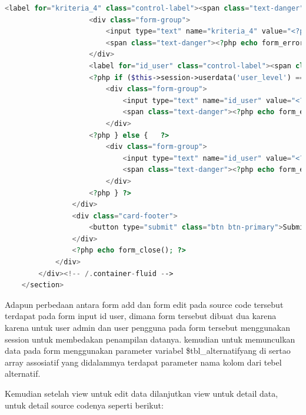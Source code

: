 \begin{lstlisting}[language=PHP]
	                <label for="kriteria_4" class="control-label"><span class="text-danger">*</span>Memori</label>  
	                <div class="form-group">  
	                    <input type="text" name="kriteria_4" value="<?php echo ($this->input->post('kriteria_4') ? $this->input->post('kriteria_4') : $tbl_alternatif['kriteria_4']); ?>" class="form-control" id="kriteria_4" />  
	                    <span class="text-danger"><?php echo form_error('kriteria_4'); ?></span>  
	                </div>  
	                <label for="id_user" class="control-label"><span class="text-danger">*</span>Id User</label>  
	                <?php if ($this->session->userdata('user_level') === 'admin') {    ?>  
	                    <div class="form-group">  
	                        <input type="text" name="id_user" value="<?php echo ($this->input->post('id_user') ? $this->input->post('id_user') : $tbl_alternatif['id_user']); ?>" class="form-control" id="id_user" /> 
	                        <span class="text-danger"><?php echo form_error('id_user'); ?></span>  
	                    </div>  
	                <?php } else {   ?>  
	                    <div class="form-group">  
	                        <input type="text" name="id_user" value="<?php echo ($this->input->post('id_user') ? $this->input->post('id_user') : $tbl_alternatif['id_user']); ?>" class="form-control" id="id_user" readonly />  
	                        <span class="text-danger"><?php echo form_error('id_user'); ?></span> 
	                    </div>  
	                <?php } ?>  
	            </div>  
	            <div class="card-footer">  
	                <button type="submit" class="btn btn-primary">Submit</button>  
	            </div>  
	            <?php echo form_close(); ?>  
	        </div>  
	    </div><!-- /.container-fluid -->  
	</section>  
\end{lstlisting}

	Adapun perbedaan antara form add dan form edit pada source code tersebut terdapat pada form input id user, dimana form tersebut dibuat dua karena karena untuk user admin dan user pengguna pada form tersebut menggunakan session untuk membedakan penampilan datanya. kemudian untuk memunculkan data pada form menggunakan parameter variabel \$tbl\_alternatifyang di sertao array assosiatif yang didalammya terdapat parameter nama kolom dari tebel alternatif.\par
	Kemudian setelah view untuk edit data dilanjutkan view untuk detail data, untuk detail source codenya seperti berikut:\par

